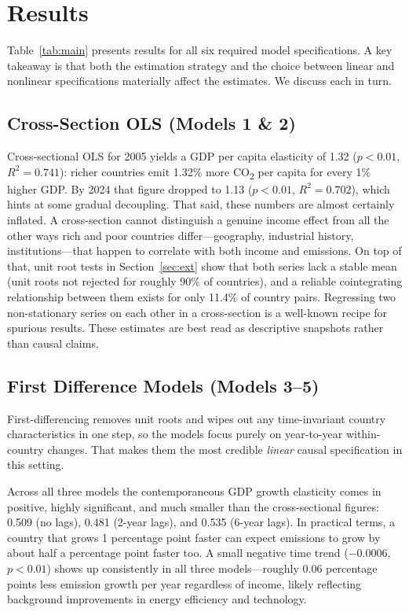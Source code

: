 \documentclass[12pt, a4paper]{article}
\begin{document}
\section{Results}

Table~\ref{tab:main} presents results for all six required model specifications. A key takeaway is that both the estimation strategy and the choice between linear and nonlinear specifications materially affect the estimates. We discuss each in turn.

\subsection{Cross-Section OLS (Models 1 \& 2)}

Cross-sectional OLS for 2005 yields a GDP per capita elasticity of 1.32 ($p < 0.01$, $R^2 = 0.741$): richer countries emit 1.32\% more CO\textsubscript{2} per capita for every 1\% higher GDP. By 2024 that figure dropped to 1.13 ($p < 0.01$, $R^2 = 0.702$), which hints at some gradual decoupling. That said, these numbers are almost certainly inflated. A cross-section cannot distinguish a genuine income effect from all the other ways rich and poor countries differ---geography, industrial history, institutions---that happen to correlate with both income and emissions. On top of that, unit root tests in Section~\ref{sec:ext} show that both series lack a stable mean (unit roots not rejected for roughly 90\% of countries), and a reliable cointegrating relationship between them exists for only 11.4\% of country pairs. Regressing two non-stationary series on each other in a cross-section is a well-known recipe for spurious results. These estimates are best read as descriptive snapshots rather than causal claims.

\subsection{First Difference Models (Models 3--5)}

First-differencing removes unit roots and wipes out any time-invariant country characteristics in one step, so the models focus purely on year-to-year within-country changes. That makes them the most credible \emph{linear} causal specification in this setting.

Across all three models the contemporaneous GDP growth elasticity comes in positive, highly significant, and much smaller than the cross-sectional figures: 0.509 (no lags), 0.481 (2-year lags), and 0.535 (6-year lags). In practical terms, a country that grows 1 percentage point faster can expect emissions to grow by about half a percentage point faster too. A small negative time trend ($-0.0006$, $p < 0.01$) shows up consistently in all three models---roughly 0.06 percentage points less emission growth per year regardless of income, likely reflecting background improvements in energy efficiency and technology.
\end{document}
